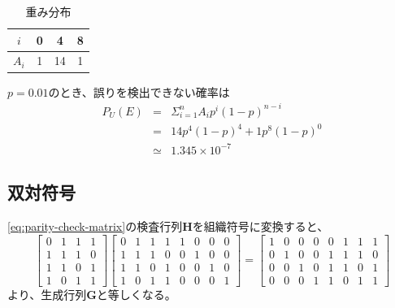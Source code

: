 \documentclass[a4paper,11pt]{jsarticle}
\begin{document}
\begin{table}[hbtp]
  \caption{重み分布}
  \label{table:weight-dist}
  \centering
  \begin{tabular}{|c|ccc|}
    \hline
    $i$ & 0 & 4 & 8 \\ \hline
    $A_i$ & 1 & 14 & 1 \\ \hline
  \end{tabular}
\end{table}

$p=0.01$のとき、誤りを検出できない確率は
\begin{eqnarray*}
  P_U(E) &=& \Sigma_{i=1}^{n}{A_ip^i(1-p)^{n-i}} \\
  &=& 14p^4(1-p)^4+1p^8(1-p)^0 \\
  &\simeq& 1.345 \times 10^{-7}
\end{eqnarray*}

\subsection{双対符号}
\eqref{eq:parity-check-matrix}の検査行列${\bm H}$を組織符号に変換すると、
\begin{equation*}
  \begin{bmatrix}
    0 & 1 & 1 & 1 \\
    1 & 1 & 1 & 0 \\
    1 & 1 & 0 & 1 \\
    1 & 0 & 1 & 1
  \end{bmatrix}
  \begin{bmatrix}
    0 & 1 & 1 & 1 & 1 & 0 & 0 & 0 \\
    1 & 1 & 1 & 0 & 0 & 1 & 0 & 0 \\
    1 & 1 & 0 & 1 & 0 & 0 & 1 & 0 \\
    1 & 0 & 1 & 1 & 0 & 0 & 0 & 1
  \end{bmatrix}=
  \begin{bmatrix}
    1 & 0 & 0 & 0 & 0 & 1 & 1 & 1 \\
    0 & 1 & 0 & 0 & 1 & 1 & 1 & 0 \\
    0 & 0 & 1 & 0 & 1 & 1 & 0 & 1 \\
    0 & 0 & 0 & 1 & 1 & 0 & 1 & 1
  \end{bmatrix}
\end{equation*}
より、生成行列${\bm G}$と等しくなる。
\end{document}
